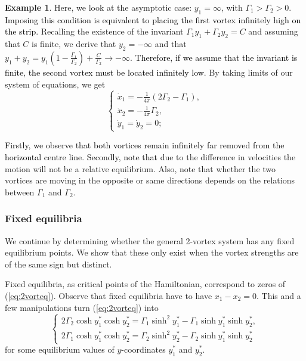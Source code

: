 \documentclass[11pt,twoside]{article}
\theoremstyle{definition}
\newtheorem{Exam}[theorem]{Example}
\numberwithin{equation}{section}
\begin{document}
\begin{Exam}
\label{sec: Example3}
Here, we look at the asymptotic case: $y_1 = \infty$, with $\Gamma_1>\Gamma_2>0$. \textcolor{black}{Imposing this condition is equivalent to placing the first vortex infinitely high on the strip.  }  Recalling the existence of the invariant $\Gamma_1y_1 + \Gamma_2y_2 = C$ and assuming that $C$ is finite, we derive that $y_2 = -\infty$ and that $y_1 + y_2 = y_1\left(1 - \frac{\Gamma_1}{\Gamma_2}\right) + \frac{C}{\Gamma_2}\to-\infty$. \textcolor{black}{Therefore, if we assume that the invariant is finite, the second vortex must be located infinitely low}.  By taking limits of our system of equations, we get
\begin{equation}
\label{eq: examp 3}
    \begin{cases}
    \dot{x}_1  = -\frac{1}{4\pi}(2\Gamma_2 -\Gamma_1),\\
    \dot{x}_2 = -\frac{1}{4\pi}\Gamma_2 ,\\
    \dot{y}_1 = \dot{y}_2 = 0;
    \end{cases}
\end{equation}

\textcolor{black}{Firstly, we observe that both vortices remain infinitely far removed from the horizontal centre line}. \textcolor{black}{Secondly, note that } due to the difference in velocities the motion will not be a relative equilibrium. Also, note that whether the two vortices are moving in the opposite or same directions depends on the relations between $\Gamma_1$ and $\Gamma_2$.
\end{Exam}


\subsubsection{Fixed equilibria}
\label{sec:fixed equil}

We continue by determining whether the general 2-vortex system has any fixed equilibrium points. We show that these only exist when the vortex strengths are of the same sign but distinct. 

Fixed equilibria, as critical points of the Hamiltonian, correspond to zeros of (\ref{eq:2vorteq}). Observe that fixed equilibria have to have $x_1-x_2=0$. This and a  few manipulations turn (\ref{eq:2vorteq}) into
\begin{equation}
    \label{eq: fixed equilibria conditions}
    \begin{cases}
    2\Gamma_2\cosh y^{\ast}_1\cosh y^{\ast}_2 = \Gamma_1\sinh^2y^{\ast}_1 - \Gamma_1\sinh y^{\ast}_1\sinh y^{\ast}_2,\\
    2\Gamma_1\cosh y^{\ast}_1\cosh y^{\ast}_2 = \Gamma_2\sinh^2y^{\ast}_2 - \Gamma_2\sinh y^{\ast}_1\sinh y^{\ast}_2
    \end{cases}
\end{equation}
for some equilibrium values of $y$-coordinates $y_1^{\ast}$ and $y_2^{\ast}$.
\end{document}
